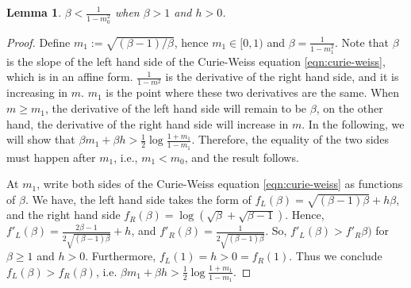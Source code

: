 \documentclass{amsart}
\newtheorem{lem}[thm]{Lemma}
\newtheorem{rem}[thm]{Remark}
\begin{document}
         \begin{lem}
         	\label{lem:slope}
         	$\beta < \frac{1}{1-m_0^2}$ when $\beta >1$ and $h>0$.
         \end{lem}
         \begin{proof}
         	Define $m_1:=\sqrt{(\beta -1)/\beta}$, hence $m_1\in [0,1)$ and $\beta = \frac{1}{1-m_1^2}$.  Note that $\beta$ is the slope of the left hand side of the Curie-Weiss equation \eqref{eqn:curie-weiss}, which is in an affine form.  $\frac{1}{1-m^2}$ is the derivative of the right hand side, and it is increasing in $m$. $m_1$ is the point where these two derivatives are the same. When $m\ge m_1$, the derivative of the left hand side will remain to be $\beta$, on the other hand, the derivative of the right hand side will increase in $m$. In the following, we will show that $\beta m_1+\beta h > \frac12\log \frac{1+m_1}{1-m_1}$. Therefore, the equality of the two sides must happen after $m_1$, i.e., $m_1<m_0$, and the result follows. 
         	
         	At $m_1$, write both sides of the Curie-Weiss equation \eqref{eqn:curie-weiss}  as functions of $\beta$. We have, the left hand side takes the form of $f_L(\beta)=\sqrt{(\beta -1)\beta}+h\beta$, and the right hand side $f_R(\beta)=\log(\sqrt{\beta}+\sqrt{\beta-1})$. Hence, $f'_L(\beta)=\frac{2\beta-1}{2\sqrt{(\beta -1)\beta}}+h$, and  $f'_R(\beta)=\frac{1}{2\sqrt{(\beta -1)\beta}}$. So, $f'_L(\beta)> f'_R\beta)$ for $\beta\ge 1$ and $h>0$. Furthermore, $f_L(1)=h >0=f_R(1)$. Thus we conclude $f_L(\beta)>f_R(\beta)$, i.e. $\beta m_1+\beta h > \frac12\log \frac{1+m_1}{1-m_1}$.
         \end{proof}
     

    
     
     
     
     
     
         
\end{document}
